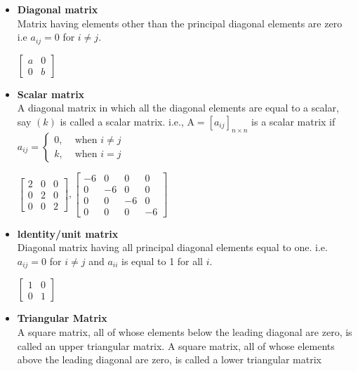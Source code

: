 \begin{itemize}
	 \item \textbf{Diagonal matrix}\\
	 Matrix having elements other than the principal diagonal elements are zero
	 i.e $a_{i j}=0$ for $i \neq j$.
	\begin{example}
		 $\left[\begin{array}{ll}a & 0 \\ 0 & b\end{array}\right]$
	\end{example}
	 \item \textbf{Scalar matrix}
	 \\ A diagonal matrix in which all the diagonal elements are equal to a scalar, say $(k)$ is called a scalar matrix. i.e., $\mathrm{A}=\left[a_{i j}\right]_{n \times n}$ is a scalar matrix if $a_{i j}=\left\{\begin{array}{ll}0, & \text { when } i \neq j \\ k, & \text { when } i=j\end{array}\right.$ 
	 \begin{example}
	 	$
	 \left[\begin{array}{lll}
	 	2 & 0 & 0 \\
	 	0 & 2 & 0 \\
	 	0 & 0 & 2
	 \end{array}\right],\left[\begin{array}{rrrr}
	 	-6 & 0 & 0 & 0 \\
	 	0 & -6 & 0 & 0 \\
	 	0 & 0 & -6 & 0 \\
	 	0 & 0 & 0 & -6
	 \end{array}\right]
	 $
	
	 \end{example}
	 \item  \textbf{ldentity/unit matrix}\\
	 Diagonal matrix having all principal diagonal elements equal to one.
	 i.e. $a_{i j}=0$ for $i \neq j$ and $a_{i i}$ is equal to 1 for all $i$.
	\begin{example}
		  $\left[\begin{array}{ll}1 & 0 \\ 0 & 1\end{array}\right]$
	\end{example}
	 \item\textbf{ Triangular Matrix}\\  A square matrix, all of whose elements below the leading diagonal are zero, is called an upper triangular matrix. A square matrix, all of whose elements above the leading diagonal are zero, is called a lower triangular matrix
	

\end{itemize}
